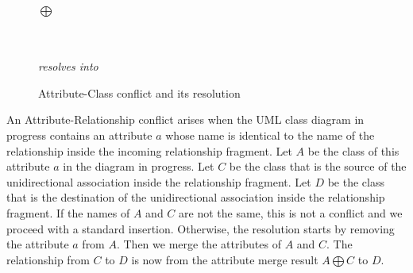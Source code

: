 \documentclass[sigconf]{acmart}
\begin{document}
\begin{figure}[h]
    \centering
    \quad $\bigoplus$ \quad
    \\ \quad \\
    \textit{resolves into}\\
    \caption{Attribute-Class conflict and its resolution}
    \label{fig:attribute-class-conflict}
\end{figure}

An Attribute-Relationship conflict arises when the UML class diagram in progress contains an attribute $a$ whose name is identical to the name of the relationship inside the incoming relationship fragment. Let $A$ be the class of this attribute $a$ in the diagram in progress. Let $C$ be the class that is the source of the unidirectional association inside the relationship fragment. Let $D$ be the class that is the destination of the unidirectional association inside the relationship fragment. If the names of $A$ and $C$ are not the same, this is not a conflict and we proceed with a standard insertion. Otherwise, the resolution starts by removing the attribute $a$ from $A$. Then we merge the attributes of $A$ and $C$. The relationship from $C$ to $D$ is now from the attribute merge result $A \bigoplus C$ to $D$. 
\end{document}
